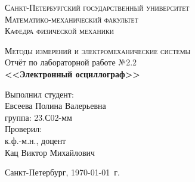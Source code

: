 \begin{titlepage}
\begin{center}
\textsc{Санкт-Петербургский государственный университет\\
Математико-механический факультет\\
Кафедра физической механики\\}

\vfill

\textsc{Методы измерений и электромеханические системы\\[3mm]}
Отчёт по лабораторной работе №2.2\\[6mm]


\textbf{\large<<Электронный осциллограф>>}

\vfill
\end{center}

\hfill
\begin{minipage}{.5\textwidth}
Выполнил студент:\\[2mm] 
Евсеева Полина Валерьевна\\
группа: 23.С02-мм\\[5mm]

Проверил:\\[2mm] 
к.ф.-м.н., доцент\\
Кац Виктор Михайлович
\end{minipage}%
\vfill
\begin{center}
 Санкт-Петербург, \yeardate\today\ г.
\end{center}
\end{titlepage}
